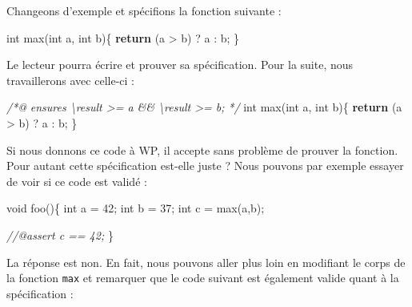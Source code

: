 \documentclass[12pt,francais,]{scrbook}
\newenvironment{Shaded}{}{}
\newcommand{\KeywordTok}[1]{\textcolor[rgb]{0.00,0.44,0.13}{\textbf{{#1}}}}
\newcommand{\DataTypeTok}[1]{\textcolor[rgb]{0.56,0.13,0.00}{{#1}}}
\newcommand{\DecValTok}[1]{\textcolor[rgb]{0.25,0.63,0.44}{{#1}}}
\newcommand{\CommentTok}[1]{\textcolor[rgb]{0.38,0.63,0.69}{\textit{{#1}}}}
\newcommand{\NormalTok}[1]{{#1}}
\begin{document}
Changeons d'exemple et spécifions la fonction suivante :

\begin{footnotesize}\begin{Shaded}
\begin{Highlighting}[]
\DataTypeTok{int} \NormalTok{max(}\DataTypeTok{int} \NormalTok{a, }\DataTypeTok{int} \NormalTok{b)\{}
  \KeywordTok{return} \NormalTok{(a > b) ? a : b;}
\NormalTok{\}}
\end{Highlighting}
\end{Shaded}\end{footnotesize}

Le lecteur pourra écrire et prouver sa spécification. Pour la suite,
nous travaillerons avec celle-ci :

\begin{footnotesize}\begin{Shaded}
\begin{Highlighting}[]
\CommentTok{/*@}
\CommentTok{  ensures \textbackslash{}result >= a && \textbackslash{}result >= b;}
\CommentTok{*/}
\DataTypeTok{int} \NormalTok{max(}\DataTypeTok{int} \NormalTok{a, }\DataTypeTok{int} \NormalTok{b)\{}
  \KeywordTok{return} \NormalTok{(a > b) ? a : b;}
\NormalTok{\}}
\end{Highlighting}
\end{Shaded}\end{footnotesize}

Si nous donnons ce code à WP, il accepte sans problème de prouver la
fonction. Pour autant cette spécification est-elle juste ? Nous pouvons
par exemple essayer de voir si ce code est validé :

\begin{footnotesize}\begin{Shaded}
\begin{Highlighting}[]
\DataTypeTok{void} \NormalTok{foo()\{}
  \DataTypeTok{int} \NormalTok{a = }\DecValTok{42}\NormalTok{;}
  \DataTypeTok{int} \NormalTok{b = }\DecValTok{37}\NormalTok{;}
  \DataTypeTok{int} \NormalTok{c = max(a,b);}

  \CommentTok{//@assert c == 42;}
\NormalTok{\}}
\end{Highlighting}
\end{Shaded}\end{footnotesize}

La réponse est non. En fait, nous pouvons aller plus loin en modifiant
le corps de la fonction \texttt{max} et remarquer que le code suivant
est également valide quant à la spécification :
\end{document}
